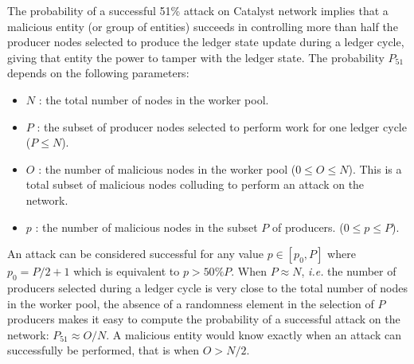 The probability of a successful 51\% attack on Catalyst network implies that a malicious entity (or group of entities) succeeds in controlling more than half the producer nodes selected to produce the ledger state update during a ledger cycle, giving that entity the power to tamper with the ledger state. The probability $P_{51}$ depends on the following parameters:
\begin{itemize}
\item $N$ : the total number of nodes in the worker pool. 
\item $P$ : the subset of producer nodes selected to perform work for one ledger cycle ($P \leq N$).
\item $O$ : the number of malicious nodes in the worker pool ($0 \leq O \leq N$). This is a total subset of malicious nodes colluding to perform an attack on the network.
\item $p$ : the number of malicious nodes in the subset $P$ of producers. ($0 \leq p \leq P$).
\end{itemize}
An attack can be considered successful for any value $p \in [p_0,P]$ where $p_0 = P/2 + 1$ which is equivalent to $p > 50\%P$. When $P \approx N$, \textit{i.e.} the number of producers selected during a ledger cycle is very close to the total number of nodes in the worker pool, the absence of a randomness element in the selection of $P$ producers makes it easy to compute the probability of a successful attack on the network: $P_{51} \approx O/N$. A malicious entity would know exactly when an attack can successfully be performed, that is when $O > N/2$. \\

